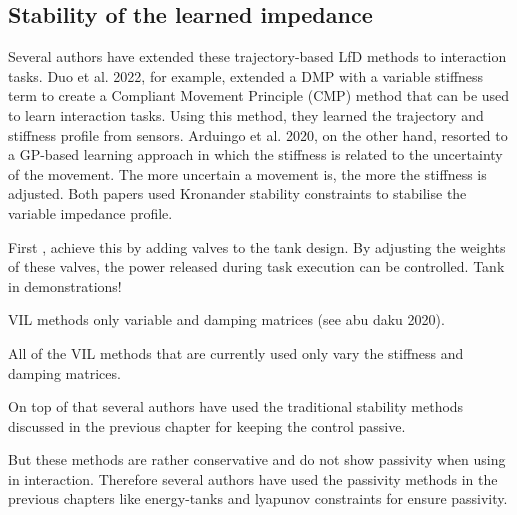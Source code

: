 \subsection{Stability of the learned impedance}




Several authors have extended these trajectory-based LfD methods to interaction tasks. Duo et al. 2022, for example, \cite{douRobotSkillLearning2022} extended a DMP with a variable stiffness term to create a Compliant Movement Principle (CMP) method that can be used to learn interaction tasks. Using this method, they learned the trajectory and stiffness profile from sensors. Arduingo et al. 2020, on the other hand, resorted to a GP-based learning approach in which the stiffness is related to the uncertainty of the movement. The more uncertain a movement is, the more the stiffness is adjusted. Both papers used Kronander stability constraints to stabilise the variable impedance profile.

First \cite{shahriariAdaptingContactsEnergy2017}, achieve this by adding valves to the tank design. By adjusting the weights of these valves, the power released during task execution can be controlled. Tank in demonstrations!

VIL methods only variable and damping matrices (see abu daku 2020).

All of the VIL methods that are currently used only vary the stiffness and damping matrices.

On top of that several authors have used the traditional stability methods discussed in the previous chapter for keeping the control passive.

But these methods are rather conservative and do not show passivity when using in interaction. Therefore several authors have used the passivity methods in the previous chapters like energy-tanks and lyapunov constraints for ensure passivity.

